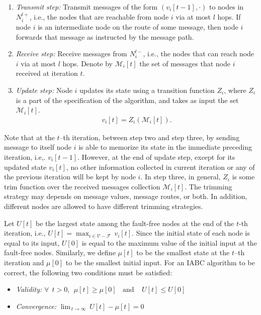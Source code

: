 \documentclass[letterpaper, 11pt]{article}
\newcommand{\calF}{{\mathcal{F}}}
\newcommand{\calM}{{\mathcal{M}}}
\newcommand{\calV}{{\mathcal{V}}}
\begin{document}
\begin{enumerate}
\item {\em Transmit step:} Transmit messages of the form $(v_i[t-1], \cdot)$ to nodes in $N_i^{l+}$, i.e., the nodes that are reachable from node $i$ via at most $l$ hops. If node $i$ is an intermediate node on the route of some message, then node $i$ forwards that message as instructed by the message path.
\item {\em Receive step:} Receive messages from $N_i^{l-}$, i.e., the nodes that can reach node $i$ via at most $l$ hops.
Denote by $\calM_i[t]$ the set of messages that node $i$ received
at iteration $t$. \item \textit{Update step:} Node $i$ updates its state using a transition function $Z_i$, where $Z_i$ is a part of the specification of the algorithm, and takes as input the set $\calM_i[t]$.\begin{eqnarray}
v_i[t]=Z_i(\calM_i[t]).
\label{eq:Z_i}
\end{eqnarray}
\end{enumerate}
Note that at the $t$--th iteration, between step two and step three, by sending message to itself node $i$ is able to memorize its state in the immediate preceding iteration, i.e,. $v_i[t-1]$. However, at the end of update step, except for its updated state $v_i[t]$, no other information collected in current iteration or any of the previous iteration will be kept by node $i$. In step three, in general, $Z_i$ is some trim function over the received messages collection $\calM_i[t]$. The trimming strategy may depends on message values, message routes, or both. In addition, different nodes are allowed to have different trimming strategies.

Let $U[t]$ be the largest state among the fault-free nodes at the end of the $t$-th iteration, i.e., $U[t] = \max_{i\in\calV-\calF}\,v_i[t]$.
Since the initial state of each node is equal to its input,
$U[0]$ is equal to the maximum value of the initial input at the fault-free nodes. Similarly, we define $\mu[t]$ to be the smallest state at the $t$--th iteration and $\mu[0]$ to be the smallest initial input.
For an IABC algorithm to be correct, the following two conditions must be satisfied:
\begin{itemize}
\item {\em Validity:} $\forall~~ t>0,
~~\mu[t]\ge \mu[0]
~\mbox{~~and~~}~
~U[t]\le U[0]$

\item {\em Convergence:} $\lim_{\,t\rightarrow\infty} ~ U[t]-\mu[t] = 0$
\end{itemize}
\end{document}
